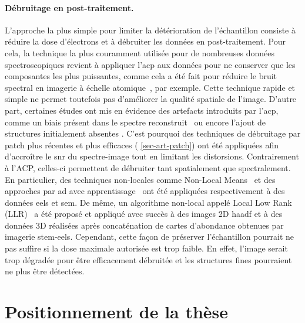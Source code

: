     \paragraph{Débruitage en post-traitement.} L'approche la plus simple pour limiter la détérioration de l'échantillon consiste à réduire la dose d'électrons et à débruiter les données en post-traitement. 
    Pour cela, la technique la plus couramment utilisée pour de nombreuses données spectroscopiques revient à appliquer l'\gls{acp} aux données pour ne conserver que les composantes les plus puissantes, comme cela a été fait pour réduire le bruit spectral en imagerie à échelle atomique~\cite{bosman2007two,dudeck2012quantitative}, par exemple. Cette technique rapide et simple ne permet toutefois pas d'améliorer la qualité spatiale de l'image. D'autre part, certaines études ont mis en évidence des artefacts introduits par l'\gls{acp}, comme un biais présent dans le spectre reconstruit~\cite{lichtert2013statistical, spiegelberg2017can} ou encore l'ajout de structures initialement absentes \cite{mevenkamp2017mm}.
    C'est pourquoi des techniques de débruitage par patch plus récentes et plus efficaces (\cf{} \cref{sec-art-patch}) ont été appliquées afin d'accroître le \gls{snr} du spectre-image tout en limitant les distorsions. Contrairement à l'ACP, celles-ci permettent de débruiter tant spatialement que spectralement. En particulier, des techniques non-locales comme Non-Local Means~\cite{mevenkamp2017mm, mevenkamp2020multimodal} et des approches par \gls{ad} avec apprentissage~\cite{trampert2018ultramicroscopy} ont été appliquées respectivement à des données \gls{eels} et  \gls{sem}. De même, un algorithme non-local appelé Local Low Rank (LLR)~\cite{spiegelberg2018local} a été proposé et appliqué avec succès à des images 2D \gls{haadf} et à des données 3D réalisées après concaténation de cartes d'abondance obtenues par imagerie \gls{stem}-\gls{eels}.
    Cependant, cette façon de préserver l'échantillon pourrait ne pas suffire si la dose maximale autorisée est trop faible. En effet, l'image serait trop dégradée pour être efficacement débruitée et les structures fines pourraient ne plus être détectées. 
    
    
    \section{Positionnement de la thèse}\label{sec-positionnement-these}

